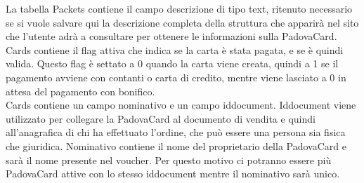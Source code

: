 La tabella Packets contiene il campo descrizione di tipo text, ritenuto necessario se si vuole salvare qui la descrizione completa della struttura che apparirà nel sito che l'utente adrà a consultare per ottenere le informazioni sulla PadovaCard. \\

Cards contiene il flag attiva che indica se la carta è stata pagata, e se è quindi valida. Questo flag è settato a 0 quando la carta viene creata, quindi a 1 se il pagamento avviene con contanti o carta di credito, mentre viene lasciato a 0 in attesa del pagamento con bonifico. \\

Cards contiene un campo nominativo e un campo iddocument. Iddocument viene utilizzato per collegare la PadovaCard al documento di vendita e quindi all'anagrafica di chi ha effettuato l'ordine, che può essere una persona sia fisica che giuridica. Nominativo contiene il nome del proprietario della PadovaCard e sarà il nome presente nel voucher. Per questo motivo ci potranno essere più PadovaCard attive con lo stesso iddocument mentre il nominativo sarà unico.\\


